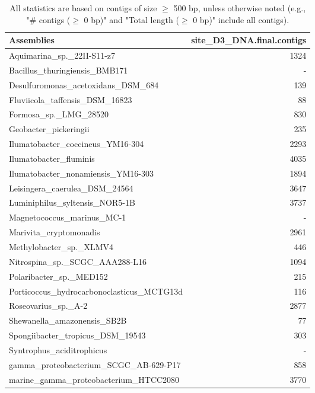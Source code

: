 \documentclass[12pt,a4paper]{article}
\begin{document}
\begin{table}[ht]
\begin{center}
\caption{All statistics are based on contigs of size $\geq$ 500 bp, unless otherwise noted (e.g., "\# contigs ($\geq$ 0 bp)" and "Total length ($\geq$ 0 bp)" include all contigs).}
\begin{tabular}{|l*{1}{|r}|}
\hline
Assemblies & site\_D3\_DNA.final.contigs \\ \hline
Aquimarina\_sp.\_22II-S11-z7 & 1324 \\ \hline
Bacillus\_thuringiensis\_BMB171 & - \\ \hline
Desulfuromonas\_acetoxidans\_DSM\_684 & 139 \\ \hline
Fluviicola\_taffensis\_DSM\_16823 & 88 \\ \hline
Formosa\_sp.\_LMG\_28520 & 830 \\ \hline
Geobacter\_pickeringii & 235 \\ \hline
Ilumatobacter\_coccineus\_YM16-304 & 2293 \\ \hline
Ilumatobacter\_fluminis & 4035 \\ \hline
Ilumatobacter\_nonamiensis\_YM16-303 & 1894 \\ \hline
Leisingera\_caerulea\_DSM\_24564 & 3647 \\ \hline
Luminiphilus\_syltensis\_NOR5-1B & 3737 \\ \hline
Magnetococcus\_marinus\_MC-1 & - \\ \hline
Marivita\_cryptomonadis & 2961 \\ \hline
Methylobacter\_sp.\_XLMV4 & 446 \\ \hline
Nitrospina\_sp.\_SCGC\_AAA288-L16 & 1094 \\ \hline
Polaribacter\_sp.\_MED152 & 215 \\ \hline
Porticoccus\_hydrocarbonoclasticus\_MCTG13d & 116 \\ \hline
Roseovarius\_sp.\_A-2 & 2877 \\ \hline
Shewanella\_amazonensis\_SB2B & 77 \\ \hline
Spongiibacter\_tropicus\_DSM\_19543 & 303 \\ \hline
Syntrophus\_aciditrophicus & - \\ \hline
gamma\_proteobacterium\_SCGC\_AB-629-P17 & 858 \\ \hline
marine\_gamma\_proteobacterium\_HTCC2080 & 3770 \\ \hline
\end{tabular}
\end{center}
\end{table}
\end{document}
